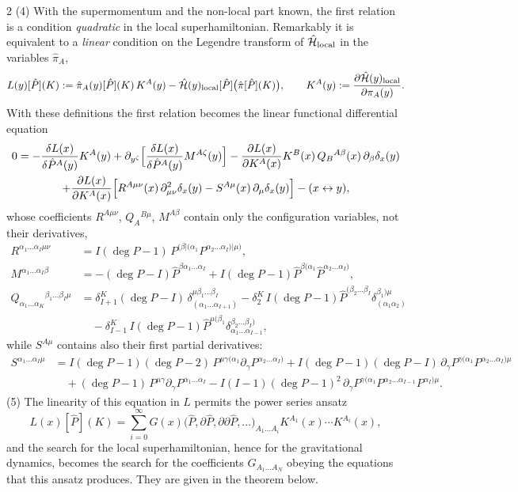 \begin{paracol}{2}
(4) With the supermomentum and the non-local part known, the first relation is a condition \emph{quadratic} in the local superhamiltonian. Remarkably it is equivalent to a \emph{linear} condition on the Legendre transform of $\hat{\mathcal H}_{\rm local}$ in the variables $\hat\pi_A$,
\[
  L(y)[\hat P](K):=\hat\pi_A(y)[\hat P](K)\,K^A(y)-\hat{\mathcal H}(y)_{\rm local}[\hat P]\bigl(\hat\pi[\hat P](K)\bigr),\qquad K^A(y):=\frac{\partial\hat{\mathcal H}(y)_{\rm local}}{\partial\pi_A(y)}.
\]
With these definitions the first relation becomes the linear functional differential equation
\begin{multline*}
  0=-\frac{\delta L(x)}{\delta\hat P^A(y)}K^A(y)+\partial_{y^\zeta}\Bigl[\frac{\delta L(x)}{\delta\hat P^A(y)}M^{A\zeta}(y)\Bigr]-\frac{\partial L(x)}{\partial K^A(x)}K^B(x)\,Q_B{}^{A\beta}(x)\,\partial_\beta\delta_x(y)\\
  +\frac{\partial L(x)}{\partial K^A(x)}\Bigl[R^{A\mu\nu}(x)\,\partial^2_{\mu\nu}\delta_x(y)-S^{A\mu}(x)\,\partial_\mu\delta_x(y)\Bigr]-(x\leftrightarrow y),
\end{multline*}
whose coefficients $R^{A\mu\nu}$, $Q_A{}^{B\mu}$, $M^{A\beta}$ contain only the configuration variables, not their derivatives,
\begin{align*}
  R^{\alpha_1\dots\alpha_I\mu\nu}&=I(\deg P-1)\,P^{(\beta|(\alpha_1}P^{\alpha_2\dots\alpha_I)|\mu)},\\
  M^{\alpha_1\dots\alpha_I\beta}&=-(\deg P-I)\hat P^{\beta\alpha_1\dots\alpha_I}+I(\deg P-1)\hat P^{\beta(\alpha_1}\hat P^{\alpha_2\dots\alpha_I)},\\
  Q_{\alpha_1\dots\alpha_K}{}^{\beta_1\dots\beta_I\mu}&=\delta^K_{I+1}(\deg P-I)\,\delta^{\mu\beta_1\dots\beta_I}_{(\alpha_1\dots\alpha_{I+1})}-\delta^K_2\,I(\deg P-1)\hat P^{(\beta_2\dots\beta_I}\delta^{\beta_1)\mu}_{(\alpha_1\alpha_2)}\\
  &\quad-\delta^K_{I-1}\,I(\deg P-1)\hat P^{\mu(\beta_1}\delta^{\beta_2\dots\beta_I)}_{\alpha_1\dots\alpha_{I-1}},
\end{align*}
while $S^{A\mu}$ contains also their first partial derivatives:
\begin{align*}
  S^{\alpha_1\dots\alpha_I\mu}&=I(\deg P-1)(\deg P-2)\,P^{\mu\gamma(\alpha_1}\partial_\gamma P^{\alpha_2\dots\alpha_I)}+I(\deg P-1)(\deg P-I)\,\partial_\gamma P^{\gamma(\alpha_1}P^{\alpha_2\dots\alpha_I)\mu}\\
  &\quad+(\deg P-1)\,P^{\mu\gamma}\partial_\gamma P^{\alpha_1\dots\alpha_I}-I(I-1)(\deg P-1)^2\,\partial_\gamma P^{\gamma(\alpha_1}P^{\alpha_2\dots\alpha_{I-1}}P^{\alpha_I)\mu}.
\end{align*}
(5) The linearity of this equation in $L$ permits the power series ansatz
\[
  L(x)[\hat P](K)=\sum_{i=0}^\infty G(x)\bigl(\hat P,\partial\hat P,\partial\partial\hat P,\dots\bigr)_{A_1\dots A_i}K^{A_1}(x)\cdots K^{A_i}(x),
\]
and the search for the local superhamiltonian, hence for the gravitational dynamics, becomes the search for the coefficients $G_{A_1\dots A_N}$ obeying the equations that this ansatz produces. They are given in the theorem below.


\end{paracol}
